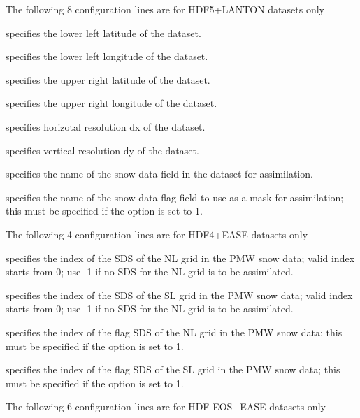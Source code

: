  The following 8 configuration lines are for HDF5+LANTON datasets only
 
  specifies the lower left latitude
 of the dataset.
 
  specifies the lower left longitude
 of the dataset.
 
  specifies the upper right latitude
 of the dataset.
 
  specifies the upper right longitude
 of the dataset.
 
  specifies horizotal resolution dx
 of the dataset.
 
  specifies vertical resolution dy
 of the dataset.
 
  specifies the name of the snow
 data field in the dataset for assimilation.
 
  specifies the name of the
 snow data
 flag field to use as a mask for assimilation; this must be specified if 
 the  option is set to 1.

 The following 4 configuration lines are for HDF4+EASE datasets only
 
 specifies the index of the SDS of the NL grid in the PMW snow data;
 valid index starts from 0; use -1 if no SDS for the NL grid is to be
 assimilated.

 specifies the index of the SDS of the SL grid in the PMW snow data;
 valid index starts from 0; use -1 if no SDS for the NL grid is to be
 assimilated.

 specifies the index of the flag SDS of the NL grid in the PMW snow data;
 this must be specified if
 the  option is set to 1.

 specifies the index of the flag SDS of the SL grid in the PMW snow data;
 this must be specified if
 the  option is set to 1.

 The following 6 configuration lines are for HDF-EOS+EASE datasets only

